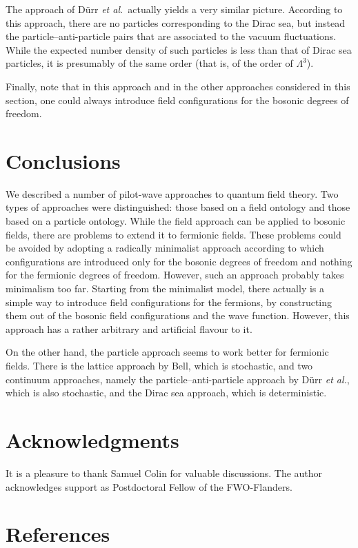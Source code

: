 \documentclass[12pt]{article}
\begin{document}
The approach of D\"urr {\em  et al.}\ actually yields a very similar picture. According to this approach, there are no particles corresponding to the Dirac sea, but instead the particle--anti-particle pairs that are associated to the vacuum fluctuations. While the expected number density of such particles is less than that of Dirac sea particles, it is presumably of the same order (that is, of the order of $\Lambda^3$).

Finally, note that in this approach and in the other approaches considered in this section, one could always introduce field configurations for the bosonic degrees of freedom. 


\section{Conclusions}
We described a number of pilot-wave approaches to quantum field theory. Two types of approaches were distinguished: those based on a field ontology and those based on a particle ontology. While the field approach can be applied to bosonic fields, there are problems to extend it to fermionic fields. These problems could be avoided by adopting a radically minimalist approach according to which configurations are introduced only for the bosonic degrees of freedom and nothing for the fermionic degrees of freedom. However, such an approach probably takes minimalism too far. Starting from the minimalist model, there actually is a simple way to introduce field configurations for the fermions, by constructing them out of the bosonic field configurations and the wave function. However, this approach has a rather arbitrary and artificial flavour to it. 

On the other hand, the particle approach seems to work better for fermionic fields. There is the lattice approach by Bell, which is stochastic, and two continuum approaches, namely the particle--anti-particle approach by D\"urr {\em et al.}, which is also stochastic, and the Dirac sea approach, which is deterministic. 



\section*{Acknowledgments}
It is a pleasure to thank Samuel Colin for valuable discussions. The author acknowledges support as Postdoctoral Fellow of the FWO-Flanders.

\section*{References}
\end{document}
